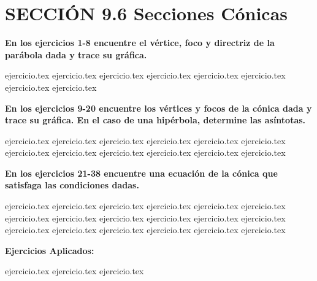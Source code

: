 
\section*{SECCIÓN 9.6 \quad Secciones Cónicas}

\noindent\textbf{En los ejercicios 1-8 encuentre el vértice, foco y directriz de la parábola dada y trace su gráfica.}
\begin{enumerate}
    {ejercicio.tex}
{ejercicio.tex}
{ejercicio.tex}
{ejercicio.tex}
{ejercicio.tex}
{ejercicio.tex}
{ejercicio.tex}
{ejercicio.tex}
\end{enumerate}

\vspace{0.3cm}
\noindent\textbf{En los ejercicios 9-20 encuentre los vértices y focos de la cónica dada y trace su gráfica. En el caso de una hipérbola, determine las asíntotas.}
\begin{enumerate}
    \setcounter{enumi}{8}
    {ejercicio.tex}
{ejercicio.tex}
{ejercicio.tex}
{ejercicio.tex}
{ejercicio.tex}
{ejercicio.tex}
{ejercicio.tex}
{ejercicio.tex}
{ejercicio.tex}
{ejercicio.tex}
{ejercicio.tex}
{ejercicio.tex}
\end{enumerate}

\vspace{0.3cm}
\noindent\textbf{En los ejercicios 21-38 encuentre una ecuación de la cónica que satisfaga las condiciones dadas.}
\begin{enumerate}
    \setcounter{enumi}{20}
    {ejercicio.tex}
{ejercicio.tex}
{ejercicio.tex}
{ejercicio.tex}
{ejercicio.tex}
{ejercicio.tex}
{ejercicio.tex}
{ejercicio.tex}
{ejercicio.tex}
{ejercicio.tex}
{ejercicio.tex}
{ejercicio.tex}
{ejercicio.tex}
{ejercicio.tex}
{ejercicio.tex}
{ejercicio.tex}
{ejercicio.tex}
{ejercicio.tex}
\end{enumerate}

\vspace{0.3cm}
\noindent\textbf{Ejercicios Aplicados:}
\begin{enumerate}
    \setcounter{enumi}{38}
    {ejercicio.tex}
{ejercicio.tex}
{ejercicio.tex}
\end{enumerate}
